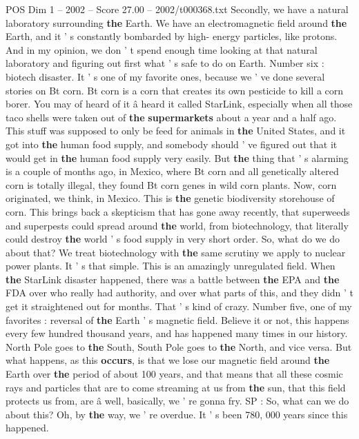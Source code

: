 \begin{textsample}{POS Dim 1 – 2002 – Score 27.00 – 2002/t000368.txt}
Secondly, we have a natural laboratory surrounding \textbf{the} Earth.
We have an electromagnetic field around \textbf{the} Earth, and it ' s constantly bombarded by high- energy particles, like protons.
And in my opinion, we don ' t spend enough time looking at that natural laboratory and figuring out first what ' s safe to do on Earth.
Number six : biotech disaster.
It ' s one of my favorite ones, because we ' ve done several stories on Bt corn.
Bt corn is a corn that creates its own pesticide to kill a corn borer.
You may of heard of it â heard it called StarLink, especially when all those taco shells were taken out of \textbf{the} \textbf{supermarkets} about a year and a half ago.
This stuff was supposed to only be feed for animals in \textbf{the} United States, and it got into \textbf{the} human food supply, and somebody should ' ve figured out that it would get in \textbf{the} human food supply very easily.
But \textbf{the} thing that ' s alarming is a couple of months ago, in Mexico, where Bt corn and all genetically altered corn is totally illegal, they found Bt corn genes in wild corn plants.
Now, corn originated, we think, in Mexico.
This is \textbf{the} genetic biodiversity storehouse of corn.
This brings back a skepticism that has gone away recently, that superweeds and superpests could spread around \textbf{the} world, from biotechnology, that literally could destroy \textbf{the} world ' s food supply in very short order.
So, what do we do about that?
We treat biotechnology with \textbf{the} same scrutiny we apply to nuclear power plants.
It ' s that simple.
This is an amazingly unregulated field.
When \textbf{the} StarLink disaster happened, there was a battle between \textbf{the} EPA and \textbf{the} FDA over who really had authority, and over what parts of this, and they didn ' t get it straightened out for months.
That ' s kind of crazy.
Number five, one of my favorites : reversal of \textbf{the} Earth ' s magnetic field.
Believe it or not, this happens every few hundred thousand years, and has happened many times in our history.
North Pole goes to \textbf{the} South, South Pole goes to \textbf{the} North, and vice versa.
But what happens, as this \textbf{occurs}, is that we lose our magnetic field around \textbf{the} Earth over \textbf{the} period of about 100 years, and that means that all these cosmic rays and particles that are to come streaming at us from \textbf{the} sun, that this field protects us from, are â well, basically, we ' re gonna fry.
SP : So, what can we do about this?
Oh, by \textbf{the} way, we ' re overdue.
It ' s been 780, 000 years since this happened.

\end{textsample}
